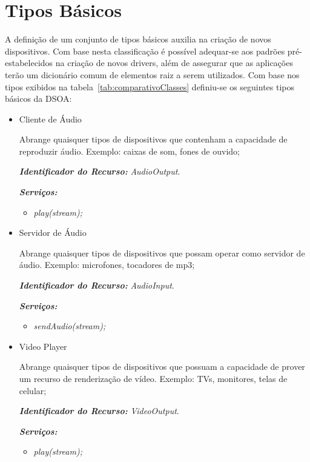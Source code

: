 \section{Tipos Básicos}
\label{sec:tiposBasicos}

A definição de um conjunto de tipos básicos auxilia na criação de novos dispositivos. Com base nesta classificação é possível adequar-se aos padrões pré-estabelecidos na criação de novos drivers, além de assegurar que as aplicações terão um dicionário comum de elementos raiz a serem utilizados. Com base nos tipos exibidos na tabela~\ref{tab:comparativoClasses} definiu-se os seguintes tipos básicos da DSOA:

\begin{itemize}
	\item Cliente de Áudio
		
		Abrange quaisquer tipos de dispositivos que contenham a capacidade de reproduzir áudio. Exemplo: caixas de som, fones de ouvido;

		\emph{\bf{Identificador do Recurso:}} \emph{AudioOutput}.

		\emph{\bf{Serviços:}}
		\begin{itemize}
			\item \emph{play(stream);}
		\end{itemize}

	\item Servidor de Áudio
		
		Abrange quaisquer tipos de dispositivos que possam operar como servidor de áudio. Exemplo: microfones, tocadores de mp3;

		\emph{\bf{Identificador do Recurso:}} \emph{AudioInput}.

		\emph{\bf{Serviços:}} 
		\begin{itemize}
			\item \emph{sendAudio(stream);}
		\end{itemize}

	\item Video Player
		
		Abrange quaisquer tipos de dispositivos que possuam a capacidade de prover um recurso de renderização de vídeo. Exemplo: TVs, monitores, telas de celular;

		\emph{\bf{Identificador do Recurso:}} \emph{VideoOutput}.

		\emph{\bf{Serviços:}} 
		\begin{itemize}
			\item \emph{play(stream);}
		\end{itemize}


\end{itemize}
